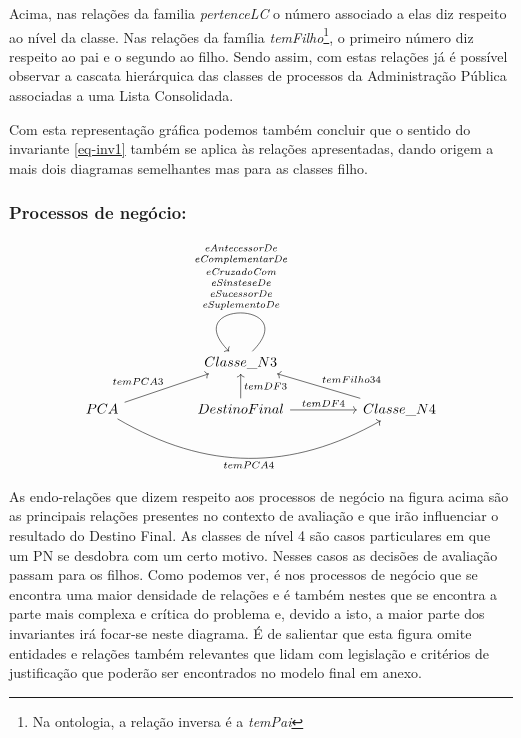 \documentclass[tikz,runningheads,a4paper]{llncs}
\begin{document}
Acima, nas relações da familia \textit{pertenceLC} o número associado a elas diz respeito ao nível da classe. Nas relações da família \textit{temFilho}\footnote{Na ontologia, a relação inversa é a \textit{temPai}}, o primeiro número diz respeito ao pai e o segundo ao filho. Sendo assim, com estas relações já é possível observar a cascata hierárquica das classes de processos da Administração Pública associadas a uma Lista Consolidada.

Com esta representação gráfica podemos também concluir que o sentido do invariante \ref{eq-inv1} também se aplica às relações apresentadas, dando origem a mais dois diagramas semelhantes mas para as classes filho.

\subsubsection{Processos de negócio:}

\begin{equation}
\label{vis_pn}
\begin{tikzcd}
            &  & Classe\_N3 \arrow[loop,swap]{u}{\textit{\shortstack{eAntecessorDe \\ eComplementarDe \\ eCruzadoCom \\ eSinsteseDe \\ eSucessorDe \\ eSuplementoDe}}}                       &  &                                       \\
PCA \arrow{rru}{temPCA3} \arrow[swap, bend right]{rrrr}{temPCA4} &  & DestinoFinal \arrow[swap]{u}{temDF3} \arrow{rr}{temDF4} &  & Classe\_N4 \arrow[swap]{llu}{temFilho34}
\end{tikzcd}
\end{equation}

As endo-relações que dizem respeito aos processos de negócio na figura acima são as principais relações presentes no contexto de avaliação e que irão influenciar o resultado do Destino Final. As classes de nível 4 são casos particulares em que um PN se desdobra com um certo motivo. Nesses casos as decisões de avaliação passam para os filhos. Como podemos ver, é nos processos de negócio que se encontra uma maior densidade de relações e é também nestes que se encontra a parte mais complexa e crítica do problema e, devido a isto, a maior parte dos invariantes irá focar-se neste diagrama. É de salientar que esta figura omite entidades e relações também relevantes que lidam com legislação e critérios de justificação que poderão ser encontrados no modelo final em anexo.
\end{document}
